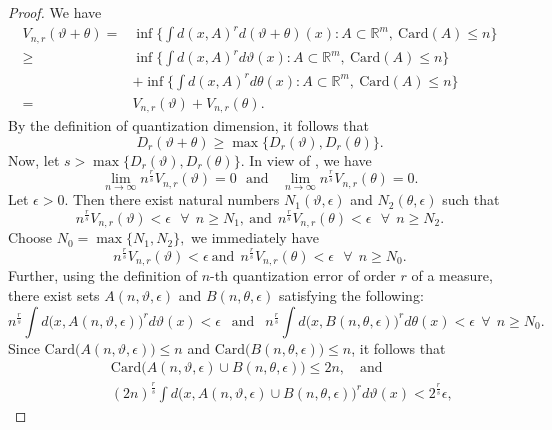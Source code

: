 \documentclass{amsproc}
\theoremstyle{definition}
\theoremstyle{remark}
\numberwithin{equation}{section}
\newcommand{\ep}{\epsilon}
\begin{document}
 \begin{proof}
 We have
 \begin{equation*}
 \begin{aligned}
 V_{n,r}(\vartheta+\theta)= & \inf \Big\{\int d(x, A)^r d(\vartheta+\theta)(x): A \subset \mathbb{R}^m,~ \text{Card}(A) \le n\Big\}\\ \ge &\inf \Big\{\int d(x, A)^r d\vartheta(x): A \subset \mathbb{R}^m, ~ \text{Card}(A) \le n\Big\} \\ & + \inf \Big\{\int d(x, A)^r d\theta(x): A \subset \mathbb{R}^m, ~ \text{Card}(A) \le n\Big\} \\  = & V_{n,r}(\vartheta)+V_{n,r}(\theta).
 \end{aligned}
 \end{equation*}
 By the definition of quantization dimension, it follows that $$D_r(\vartheta+\theta) \ge \max\{D_r(\vartheta),D_r(\theta)\}.$$
 Now, let $s>  \max\{D_r(\vartheta),D_r(\theta)\}.$ In view of \cite[Propostion $11.3$]{GL1}, we have $$ \lim_{n \to \infty} n^{\frac{r}{s}} V_{n,r}(\vartheta)=0 ~~~\text{and}~~~~  \lim_{n \to \infty} n^{\frac{r}{s}} V_{n,r}(\theta)=0.$$
 Let $\ep > 0.$ Then there exist natural numbers $N_1(\vartheta,\ep)$ and $N_2(\theta,\ep)$ such that $$ n^{\frac{r}{s}} V_{n,r}(\vartheta) < \ep ~~~ \forall~~ n \ge N_1, ~\text{and}~~ n^{\frac{r}{s}} V_{n,r}(\theta) < \ep ~~~ \forall~~ n \ge N_2.$$
 Choose $N_0=\max\{N_1,N_2\},$ we immediately have 
 $$ n^{\frac{r}{s}} V_{n,r}(\vartheta) < \ep  ~\text{and}~~ n^{\frac{r}{s}}  V_{n,r}(\theta) < \ep ~~~ \forall~~ n \ge N_0.$$ 
 Further, using the definition of $n$-th quantization error of order $r$ of a measure, there exist sets $A(n,\vartheta,\ep)$ and $B(n,\theta,\ep)$ satisfying the following:
 $$ n^{\frac{r}{s}}  \int d\Big(x, A(n,\vartheta,\ep)\Big)^r d\vartheta(x) < \ep ~~\text{ and }~~   n^{\frac{r}{s}} \int d\Big(x, B(n,\theta,\ep)\Big)^r d\theta(x) < \ep ~~ \forall ~~n \ge N_0 .$$
 Since $\text{Card}\Big(A(n,\vartheta,\ep)\Big) \le n $ and $\text{Card}\Big(B(n,\theta,\ep)\Big) \le n $, it follows that 
 \begin{equation*}
 \begin{aligned}
\hspace{1cm}&\text{Card}\Big(A(n,\vartheta,\ep) \cup B(n,\theta,\ep)\Big) \le 2n,\quad\text{and} \\& 
(2n)^{\frac{r}{s}} \int d\Big(x, A(n,\vartheta,\ep) \cup B(n,\theta,\ep)\Big)^r d\vartheta(x) < 2^{\frac{r}{s}} \ep,
 \end{aligned}
 \end{equation*}

\end{proof}
\end{document}
